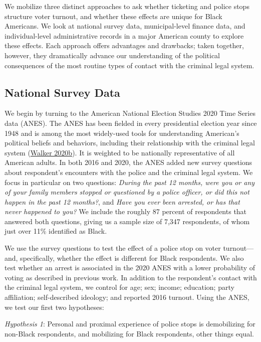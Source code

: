 \documentclass[
  12pt,
]{article}
\begin{document}
We mobilize three distinct approaches to ask whether ticketing and police stops structure voter turnout, and whether these effects are unique for Black Americans. We look at national survey data, municipal-level finance data, and individual-level administrative records in a major American county to explore these effects. Each approach offers advantages and drawbacks; taken together, however, they dramatically advance our understanding of the political consequences of the most routine types of contact with the criminal legal system.

\hypertarget{national-survey-data}{%
\subsection*{National Survey Data}\label{national-survey-data}}

We begin by turning to the American National Election Studies 2020 Time Series data (ANES). The ANES has been fielded in every presidential election year since 1948 and is among the most widely-used tools for understanding American's political beliefs and behaviors, including their relationship with the criminal legal system (\protect\hyperlink{ref-Walker2020}{Walker 2020b}). It is weighted to be nationally representative of all American adults. In both 2016 and 2020, the ANES added new survey questions about respondent's encounters with the police and the criminal legal system. We focus in particular on two questions: \emph{During the past 12 months, were you or any of your family members stopped or questioned by a police officer, or did this not happen in the past 12 months?}, and \emph{Have you ever been arrested, or has that never happened to you?} We include the roughly 87 percent of respondents that answered both questions, giving us a sample size of 7,347 respondents, of whom just over 11\% identified as Black.

We use the survey questions to test the effect of a police stop on voter turnout---and, specifically, whether the effect is different for Black respondents. We also test whether an arrest is associated in the 2020 ANES with a lower probability of voting as described in previous work. In addition to the respondent's contact with the criminal legal system, we control for age; sex; income; education; party affiliation; self-described ideology; and reported 2016 turnout. Using the ANES, we test our first two hypotheses:

\emph{Hypothesis 1}: Personal and proximal experience of police stops is demobilizing for non-Black respondents, and mobilizing for Black respondents, other things equal.
\end{document}
